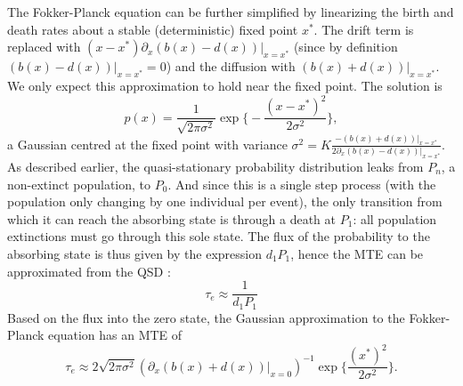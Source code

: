 The Fokker-Planck equation can be further simplified by linearizing the birth and death rates about a stable (deterministic) fixed point $x^*$. 
The drift term is replaced with $(x-x^*)\partial_x(b(x) - d(x))|_{x=x^*}$ (since by definition $(b(x) - d(x))|_{x=x^*}=0$) and the diffusion with $(b(x) + d(x))|_{x=x^*}$. 
We only expect this approximation to hold near the fixed point. 
The solution is 
\begin{equation}
p (x) = \frac{1}{\sqrt{2\pi\sigma^{2}}}\exp\Big\lbrace-\frac{(x-x^*)^2}{2\sigma^{2}}\Big\rbrace,
 \label{FP-gaussian}
\end{equation}
a Gaussian centred at the fixed point with variance $\sigma^2=K\frac{-(b(x) + d(x))|_{x=x^*}}{2\partial_x(b(x) - d(x))|_{x=x^*}}$. 
As described earlier, the quasi-stationary probability distribution leaks from $P_n$, a non-extinct population, to $P_0$.
And since this is a single step process (with the population only changing by one individual per event), the only transition from which it can reach the absorbing state is through a death at $P_1$: all population extinctions must go through this sole state. 
The flux of the probability to the absorbing state is thus given by the expression $d_1P_1$, hence the MTE can be approximated from the QSD \cite{Assaf2016}:
\begin{equation}
\tau_e \approx \frac{1}{d_1P_1}%
 \label{1overd1P1}
\end{equation}
Based on the flux into the zero state, the Gaussian approximation to the Fokker-Planck equation has an MTE of \cite{VanKampen1992}
\begin{equation}
\tau_e \approx 2\sqrt{2\pi\sigma^{2}} \left( \partial_x(b(x) + d(x))|_{x=0} \right)^{-1} \exp\Big\{\frac{(x^*)^2}{2\sigma^{2}}\Big\}. 
\end{equation}

